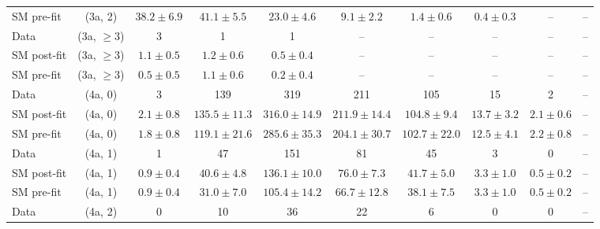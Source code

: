 \begin{table}[h!]
{\begin{tabular}{lccccccccc}
	SM pre-fit  & (3a, 2)           & $38.2\pm{ 6.9 }$     & $41.1\pm{ 5.5 }$     & $23.0\pm{ 4.6 }$   & $9.1\pm{ 2.2 }$    & $1.4\pm{ 0.6 }$    & $0.4\pm{ 0.3 }$  & --               & --           \\[0.5ex] 
	Data        & (3a, $\ge3$)      & 3                    & 1                    & 1                  & --                 & --                 & --               & --               & --           \\[0.5ex] 
	SM post-fit & (3a, $\ge3$)      & $1.1\pm{ 0.5 }$      & $1.2\pm{ 0.6 }$      & $0.5\pm{ 0.4 }$    & --                 & --                 & --               & --               & --           \\[0.5ex] 
	SM pre-fit  & (3a, $\ge3$)      & $0.5\pm{ 0.5 }$      & $1.1\pm{ 0.6 }$      & $0.2\pm{ 0.4 }$    & --                 & --                 & --               & --               & --           \\[0.5ex] 
	Data        & (4a, 0)           & 3                    & 139                  & 319                & 211                & 105                & 15               & 2                & --           \\[0.5ex] 
	SM post-fit & (4a, 0)           & $2.1\pm{ 0.8 }$      & $135.5\pm{ 11.3 }$   & $316.0\pm{ 14.9 }$ & $211.9\pm{ 14.4 }$ & $104.8\pm{ 9.4 }$  & $13.7\pm{ 3.2 }$ & $2.1\pm{ 0.6 }$  & --           \\[0.5ex] 
	SM pre-fit  & (4a, 0)           & $1.8\pm{ 0.8 }$      & $119.1\pm{ 21.6 }$   & $285.6\pm{ 35.3 }$ & $204.1\pm{ 30.7 }$ & $102.7\pm{ 22.0 }$ & $12.5\pm{ 4.1 }$ & $2.2\pm{ 0.8 }$  & --           \\[0.5ex] 
	Data        & (4a, 1)           & 1                    & 47                   & 151                & 81                 & 45                 & 3                & 0                & --           \\[0.5ex] 
	SM post-fit & (4a, 1)           & $0.9\pm{ 0.4 }$      & $40.6\pm{ 4.8 }$     & $136.1\pm{ 10.0 }$ & $76.0\pm{ 7.3 }$   & $41.7\pm{ 5.0 }$   & $3.3\pm{ 1.0 }$  & $0.5\pm{ 0.2 }$  & --           \\[0.5ex] 
	SM pre-fit  & (4a, 1)           & $0.9\pm{ 0.4 }$      & $31.0\pm{ 7.0 }$     & $105.4\pm{ 14.2 }$ & $66.7\pm{ 12.8 }$  & $38.1\pm{ 7.5 }$   & $3.3\pm{ 1.0 }$  & $0.5\pm{ 0.2 }$  & --           \\[0.5ex] 
	Data        & (4a, 2)           & 0                    & 10                   & 36                 & 22                 & 6                  & 0                & 0                & --           \\[0.5ex] 

\end{tabular}}
\end{table}
